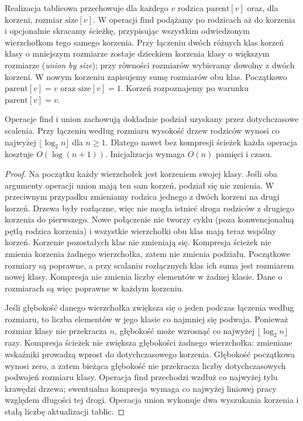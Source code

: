 Realizacja tablicowa przechowuje dla
każdego $v$ rodzica $\mathrm{parent}[v]$
oraz, dla korzeni, rozmiar $\mathrm{size}[v]$.
W operacji $\mathrm{find}$ podążamy
po rodzicach aż do korzenia
i opcjonalnie skracamy ścieżkę,
przypisując wszystkim odwiedzonym
wierzchołkom tego samego korzenia.
Przy łączeniu dwóch różnych klas
korzeń klasy o mniejszym rozmiarze zostaje
dzieckiem korzenia klasy o większym rozmiarze
(\emph{union by size}); przy równości rozmiarów
wybieramy dowolny z dwóch korzeni. W nowym korzeniu
zapisujemy sumę rozmiarów obu klas. Początkowo
$\mathrm{parent}[v]=v$ oraz $\mathrm{size}[v]=1$.
Korzeń rozpoznajemy po warunku $\mathrm{parent}[v]=v$.

\begin{stwierdzenie}
\label{prop:tg-mst-dsu}
Operacje $\mathrm{find}$ i $\mathrm{union}$
zachowują dokładnie podział uzyskany
przez dotychczasowe scalenia.
Przy łączeniu według rozmiaru
wysokość drzew rodziców wynosi
co najwyżej $\lfloor\log_2 n\rfloor$
dla $n\geq1$. Dlatego nawet
bez kompresji ścieżek każda
operacja kosztuje $O(\log(n+1))$.
Inicjalizacja wymaga $O(n)$ pamięci
i czasu.
\end{stwierdzenie}
\begin{proof}
Na początku każdy wierzchołek
jest korzeniem swojej klasy.
Jeśli oba argumenty operacji $\mathrm{union}$
mają ten sam korzeń, podział się nie zmienia.
W przeciwnym przypadku zmieniamy rodzica jednego
z dwóch korzeni na drugi korzeń. Drzewa były rozłączne,
więc nie mogła istnieć droga rodziców z drugiego
korzenia do pierwszego. Nowe połączenie nie tworzy
cyklu (poza konwencjonalną pętlą rodzica korzenia)
i wszystkie wierzchołki obu klas mają teraz wspólny
korzeń. Korzenie pozostałych klas nie zmieniają się.
Kompresja ścieżek nie
zmienia korzenia żadnego
wierzchołka, zatem nie
zmienia podziału. Początkowe rozmiary są poprawne,
a przy scalaniu rozłącznych klas ich suma jest
rozmiarem nowej klasy. Kompresja nie zmienia
liczby elementów w żadnej klasie. Dane o rozmiarach
są więc poprawne w każdym korzeniu.

Jeśli głębokość danego wierzchołka
zwiększa się o jeden podczas
łączenia według rozmiaru, to
liczba elementów w jego klasie
co najmniej się podwaja.
Ponieważ rozmiar klasy
nie przekracza $n$,
głębokość może wzrosnąć
co najwyżej $\lfloor\log_2 n\rfloor$ razy.
Kompresja ścieżek nie zwiększa głębokości żadnego
wierzchołka: zmieniane wskaźniki prowadzą wprost
do dotychczasowego korzenia. Głębokość początkowa
wynosi zero, a zatem bieżąca głębokość nie przekracza
liczby dotychczasowych podwojeń rozmiaru klasy.
Operacja $\mathrm{find}$ przechodzi wzdłuż co najwyżej
tylu krawędzi drzewa; ewentualna kompresja wymaga
co najwyżej liniowej pracy względem długości tej drogi.
Operacja $\mathrm{union}$ wykonuje dwa wyszukania
korzenia i stałą liczbę aktualizacji tablic.
\end{proof}

